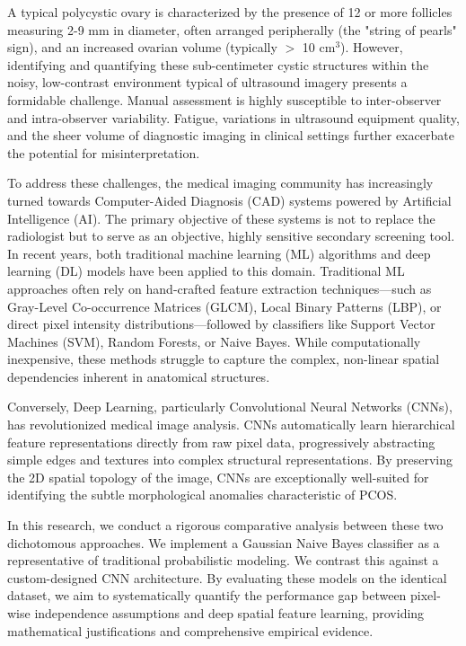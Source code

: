 \documentclass[conference]{IEEEtran}
\begin{document}
A typical polycystic ovary is characterized by the presence of 12 or more follicles measuring 2-9 mm in diameter, often arranged peripherally (the "string of pearls" sign), and an increased ovarian volume (typically $>$ 10 cm$^3$). However, identifying and quantifying these sub-centimeter cystic structures within the noisy, low-contrast environment typical of ultrasound imagery presents a formidable challenge. Manual assessment is highly susceptible to inter-observer and intra-observer variability. Fatigue, variations in ultrasound equipment quality, and the sheer volume of diagnostic imaging in clinical settings further exacerbate the potential for misinterpretation.

To address these challenges, the medical imaging community has increasingly turned towards Computer-Aided Diagnosis (CAD) systems powered by Artificial Intelligence (AI). The primary objective of these systems is not to replace the radiologist but to serve as an objective, highly sensitive secondary screening tool. In recent years, both traditional machine learning (ML) algorithms and deep learning (DL) models have been applied to this domain. Traditional ML approaches often rely on hand-crafted feature extraction techniques—such as Gray-Level Co-occurrence Matrices (GLCM), Local Binary Patterns (LBP), or direct pixel intensity distributions—followed by classifiers like Support Vector Machines (SVM), Random Forests, or Naive Bayes. While computationally inexpensive, these methods struggle to capture the complex, non-linear spatial dependencies inherent in anatomical structures.

Conversely, Deep Learning, particularly Convolutional Neural Networks (CNNs), has revolutionized medical image analysis. CNNs automatically learn hierarchical feature representations directly from raw pixel data, progressively abstracting simple edges and textures into complex structural representations. By preserving the 2D spatial topology of the image, CNNs are exceptionally well-suited for identifying the subtle morphological anomalies characteristic of PCOS.

In this research, we conduct a rigorous comparative analysis between these two dichotomous approaches. We implement a Gaussian Naive Bayes classifier as a representative of traditional probabilistic modeling. We contrast this against a custom-designed CNN architecture. By evaluating these models on the identical dataset, we aim to systematically quantify the performance gap between pixel-wise independence assumptions and deep spatial feature learning, providing mathematical justifications and comprehensive empirical evidence.
\end{document}
